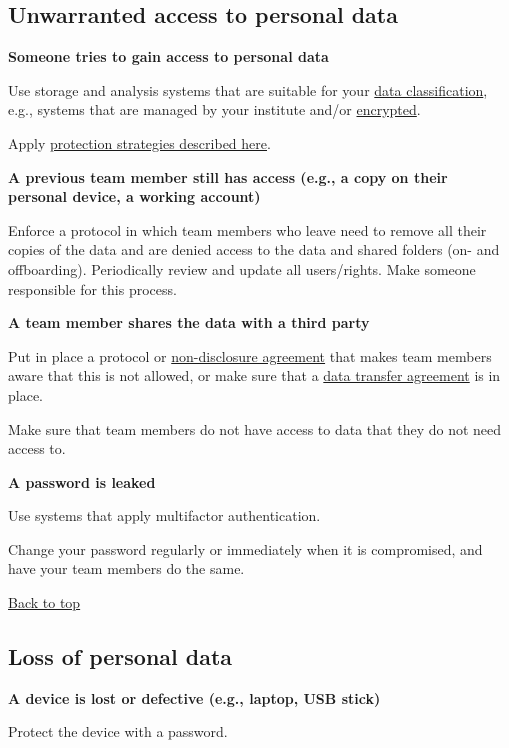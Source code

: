 \documentclass[
]{book}
\begin{document}
\hypertarget{unwarranted-access}{%
\subsection{Unwarranted access to personal data}\label{unwarranted-access}}

\textbf{Someone tries to gain access to personal data}

Use storage and analysis systems that are suitable for your \protect\hyperlink{data-classification}{data classification}, e.g., systems that are managed by your institute and/or \protect\hyperlink{encryption}{encrypted}.

Apply \protect\hyperlink{data-oriented-strategies}{protection strategies described here}.

\textbf{A previous team member still has access (e.g., a copy on their personal device, a working account)}

Enforce a protocol in which team members who leave need to remove all their copies of the data and are denied access to the data and shared folders (on- and offboarding). Periodically review and update all users/rights. Make someone responsible for this process.

\textbf{A team member shares the data with a third party}

Put in place a protocol or \protect\hyperlink{nda}{non-disclosure agreement} that makes team members aware that this is not allowed, or make sure that a \protect\hyperlink{data-transfer-agreement}{data transfer agreement} is in place.

Make sure that team members do not have access to data that they do not need access to.

\textbf{A password is leaked}

Use systems that apply multifactor authentication.

Change your password regularly or immediately when it is compromised, and have your team members do the same.

\protect\hyperlink{example-risks}{Back to top}

\hypertarget{loss-of-personal-data}{%
\subsection{Loss of personal data}\label{loss-of-personal-data}}

\textbf{A device is lost or defective (e.g., laptop, USB stick)}

Protect the device with a password.
\end{document}
